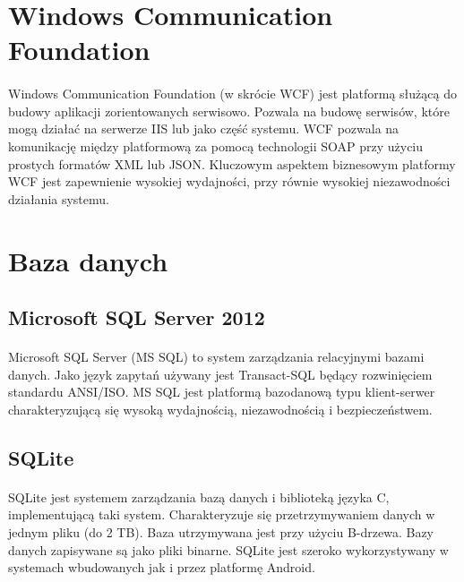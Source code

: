 \section{ Windows Communication Foundation }
\label{sec:wcf}
\paragraph{}
Windows Communication Foundation (w skrócie WCF) jest platformą służącą do budowy aplikacji zorientowanych serwisowo. Pozwala na budowę serwisów, które mogą działać na serwerze IIS lub jako część systemu. WCF pozwala na komunikację między platformową za pomocą technologii SOAP przy użyciu prostych formatów XML lub JSON. Kluczowym aspektem biznesowym platformy WCF jest zapewnienie wysokiej wydajności, przy równie wysokiej niezawodności działania systemu.

\section{Baza danych}

\subsection{Microsoft SQL Server 2012}
\label{sub:mssql}
\paragraph{}
Microsoft SQL Server (MS SQL) to system zarządzania relacyjnymi bazami danych. Jako język zapytań używany jest Transact-SQL będący rozwinięciem standardu ANSI/ISO. MS SQL jest platformą bazodanową typu klient-serwer charakteryzującą się wysoką wydajnością, niezawodnością i bezpieczeństwem.

\subsection{SQLite} %
\label{sub:sqlite}
\paragraph{} %
SQLite jest systemem zarządzania bazą danych i biblioteką języka C, implementującą taki system. Charakteryzuje się przetrzymywaniem danych w jednym pliku (do 2 TB). Baza utrzymywana jest przy użyciu B-drzewa. Bazy danych zapisywane są jako pliki binarne. SQLite jest szeroko wykorzystywany w systemach wbudowanych jak i przez platformę Android.

